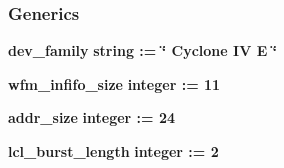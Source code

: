 \subsubsection*{Generics}
 \begin{DoxyCompactItemize}
\item 
{\bf dev\+\_\+family} {\bfseries {\bfseries \textcolor{comment}{string}\textcolor{vhdlchar}{ }\textcolor{vhdlchar}{ }\textcolor{vhdlchar}{\+:}\textcolor{vhdlchar}{=}\textcolor{vhdlchar}{ }\textcolor{vhdlchar}{ }\textcolor{vhdlchar}{ }\textcolor{vhdlchar}{ }\textcolor{keyword}{\char`\"{} Cyclone I\+V E \char`\"{}}\textcolor{vhdlchar}{ }}}
\item 
{\bf wfm\+\_\+infifo\+\_\+size} {\bfseries {\bfseries \textcolor{comment}{integer}\textcolor{vhdlchar}{ }\textcolor{vhdlchar}{ }\textcolor{vhdlchar}{\+:}\textcolor{vhdlchar}{=}\textcolor{vhdlchar}{ }\textcolor{vhdlchar}{ } \textcolor{vhdldigit}{11} \textcolor{vhdlchar}{ }}}
\item 
{\bf addr\+\_\+size} {\bfseries {\bfseries \textcolor{comment}{integer}\textcolor{vhdlchar}{ }\textcolor{vhdlchar}{ }\textcolor{vhdlchar}{\+:}\textcolor{vhdlchar}{=}\textcolor{vhdlchar}{ }\textcolor{vhdlchar}{ } \textcolor{vhdldigit}{24} \textcolor{vhdlchar}{ }}}
\item 
{\bf lcl\+\_\+burst\+\_\+length} {\bfseries {\bfseries \textcolor{comment}{integer}\textcolor{vhdlchar}{ }\textcolor{vhdlchar}{ }\textcolor{vhdlchar}{\+:}\textcolor{vhdlchar}{=}\textcolor{vhdlchar}{ }\textcolor{vhdlchar}{ } \textcolor{vhdldigit}{2} \textcolor{vhdlchar}{ }}}
\end{DoxyCompactItemize}
